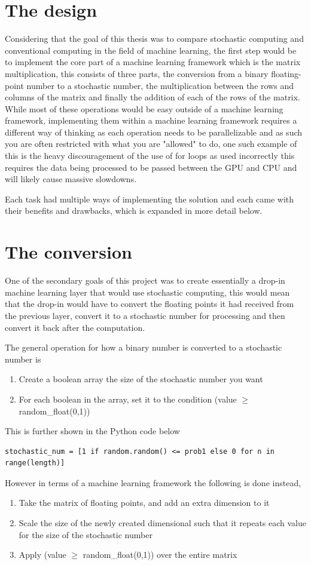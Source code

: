 \documentclass[a4paper,oneside,phd,etd]{BYUPhys}
\begin{document}
\section{The design}
Considering that the goal of this thesis was to compare stochastic computing and conventional computing in the field of machine learning, the first step would be to implement the core part of a machine learning framework which is the matrix multiplication, this consists of three parts, the conversion from a binary floating-point number to a stochastic number, the multiplication between the rows and columns of the matrix and finally the addition of each of the rows of the matrix. While most of these operations would be easy outside of a machine learning framework, implementing them within a machine learning framework requires a different way of thinking as each operation needs to be parallelizable and as such you are often restricted with what you are "allowed" to do, one such example of this is the heavy discouragement of the use of for loops\cite{broadcasting} as used incorrectly this requires the data being processed to be passed between the GPU and CPU and will likely cause massive slowdowns.

Each task had multiple ways of implementing the solution and each came with their benefits and drawbacks, which is expanded in more detail below.

\section{The conversion}
One of the secondary goals of this project was to create essentially a drop-in machine learning layer that would use stochastic computing, this would mean that the drop-in would have to convert the floating points it had received from the previous layer, convert it to a stochastic number for processing and then convert it back after the computation.

The general operation for how a binary number is converted to a stochastic number is 
\begin{enumerate}
	\item Create a boolean array the size of the stochastic number you want
	\item For each boolean in the array, set it to the condition (value $\geq$ random\_float(0,1))
\end{enumerate}
This is further shown in the Python code below
\begin{verbatim}
stochastic_num = [1 if random.random() <= prob1 else 0 for n in range(length)]
\end{verbatim}
However in terms of a machine learning framework the following is done instead, 
\begin{enumerate}
	\item Take the matrix of floating points, and add an extra dimension to it
	\item Scale the size of the newly created dimensional such that it repeats each value for the size of the stochastic number
	\item Apply (value $\geq$ random\_float(0,1)) over the entire matrix
\end{enumerate}
\end{document}
